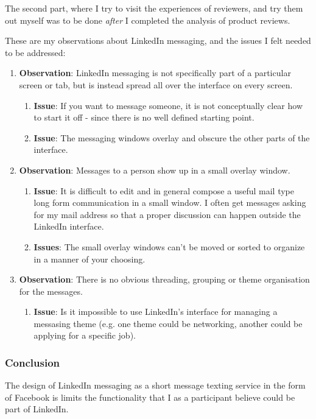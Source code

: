 \documentclass[
	letterpaper, %
]{jdf}
\begin{document}
The second part, where I try to visit the experiences of reviewers, and try them out myself was to be done \textit{after} I completed the analysis of product reviews.

These are my observations about LinkedIn messaging, and the issues I felt needed to be addressed:
\begin{enumerate}
    \item \textbf{Observation}: LinkedIn messaging is not specifically part of a particular screen or tab, but is instead spread all over the interface on every screen.
    \begin{enumerate}
    \item\textbf{Issue}: If you want to message someone, it is not conceptually clear how to start it off - since there is no well defined starting point.
    
    \item\textbf{Issue}: The messaging windows overlay and obscure the other parts of the interface.
         
    \end{enumerate}

    \item \textbf{Observation}: Messages to a person show up in a small overlay window.

    \begin{enumerate}
    \item\textbf{Issue}: It is difficult to edit and in general compose a useful mail type long form communication in a small window. I often get messages asking for my mail address so that a proper discussion can happen outside the LinkedIn interface.
    
    \item\textbf{Issues}: The small overlay windows can't be moved or sorted to organize in a manner of your choosing.
    \end{enumerate}
    \item \textbf{Observation}: There is no obvious threading, grouping or theme organisation for the messages. 
    
    \begin{enumerate}
    \item\textbf{Issue}: Is it impossible to use LinkedIn's interface for managing a messasing theme (e.g. one theme could be networking, another could be applying for a specific job).
    \end{enumerate}
\end{enumerate}


\subsubsection{Conclusion}
The design of LinkedIn messaging as a short message texting service in the form of Facebook is limits the functionality that I as a participant believe could be part of LinkedIn.
\end{document}
